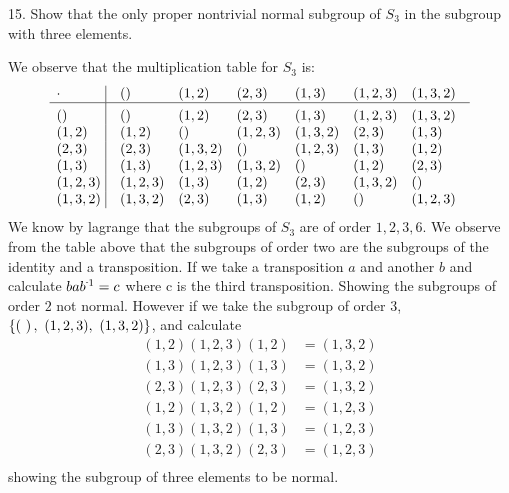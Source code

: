 \begin{mdframed}[style=darkQuesion]
  15. Show that the only proper nontrivial normal subgroup of $S_3$ in the 
  subgroup with three elements. 
\end{mdframed}
\begin{mdframed}[style=darkAnswer,frametitle={Joe Starr}]
  We observe that the multiplication table for $S_3$ is:
  $$\vbox{\tabskip0.5em\offinterlineskip
  \halign{\strut$#$\hfil\ \tabskip1em\vrule&&$#$\hfil\cr
  \cdot   &()&(1, 2)&(2, 3)&(1, 3)&(1, 2, 3)&(1, 3, 2)  \cr
      \noalign{\hrule}\vrule height 12pt width 0pt
      ()&()&(1, 2)&(2, 3)&(1, 3)&(1, 2, 3)&(1, 3, 2)     \cr
      (1, 2)&(1, 2)&()&(1, 2, 3)&(1, 3, 2)&(2, 3)&(1, 3)     \cr
      (2, 3)&(2, 3)&(1, 3, 2)&()&(1, 2, 3)&(1, 3)&(1, 2)     \cr
      (1, 3)&(1, 3)&(1, 2, 3)&(1, 3, 2)&()&(1, 2)&(2, 3)     \cr
      (1, 2, 3)&(1, 2, 3)&(1, 3)&(1, 2)&(2, 3)&(1, 3, 2)&()     \cr
      (1, 3, 2)&(1, 3, 2)&(2, 3)&(1, 3)&(1, 2)&()&(1, 2, 3)     \cr
    }}$$
We know by lagrange that the subgroups of $S_3$ are of order $1,2,3,6$. 
We observe from the table above that the subgroups of order two are the 
subgroups of the identity and a transposition. If we take a transposition $a$ and
another $b$ and calculate $ba\inv{b}=c$ where c is the third transposition. 
Showing the subgroups of order $2$ not normal. However if we take the subgroup 
of order 3, $\left\{\left(\ \right),\ (1, 2, 3),\ (1, 3, 2)\right\}$, and calculate
\begin{align*}
  (1,2)(1, 2, 3)(1,2)&=(1,3,2)\\
  (1,3)(1, 2, 3)(1,3)&=(1,3,2)\\
  (2,3)(1, 2, 3)(2,3)&=(1,3,2)\\
  (1,2)(1, 3, 2)(1,2)&=(1, 2, 3)\\
  (1,3)(1, 3, 2)(1,3)&=(1, 2, 3)\\
  (2,3)(1, 3, 2)(2,3)&=(1, 2, 3)\\
\end{align*}
showing the subgroup of three elements to be normal. 
\end{mdframed}
\newpage
